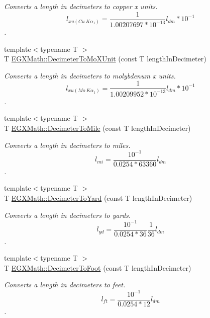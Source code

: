 \begin{DoxyCompactItemize}
\begin{DoxyCompactList}\small\item\em Converts a length in decimeters to copper x units. \[ l_{xu(Cu\ K\alpha_1)}= \frac{1}{1.00207697*10^{-13}} l_{dm} * 10^{-1}\]. \end{DoxyCompactList}\item 
{\footnotesize template$<$typename T $>$ }\\T \mbox{\hyperlink{group___e_g_x_math-_conversions-_length_conversions-_s_i-_decimeter-_non-_s_i_ga609f53e09c9a767639da3ad72905bb71}{E\+G\+X\+Math\+::\+Decimeter\+To\+Mo\+X\+Unit}} (const T length\+In\+Decimeter)
\begin{DoxyCompactList}\small\item\em Converts a length in decimeters to molybdenum x units. \[ l_{xu(Mo\ K\alpha_1)}=\frac{1}{1.00209952*10^{-13}} l_{dm} * 10^{-1}\]. \end{DoxyCompactList}\item 
{\footnotesize template$<$typename T $>$ }\\T \mbox{\hyperlink{group___e_g_x_math-_conversions-_length_conversions-_s_i-_decimeter-_imperial_gab7d9d207fb6aa53999300baf5d9cea16}{E\+G\+X\+Math\+::\+Decimeter\+To\+Mile}} (const T length\+In\+Decimeter)
\begin{DoxyCompactList}\small\item\em Converts a length in decimeters to miles. \[ l_{mi}=\frac{10^{-1}}{0.0254 * 63360} l_{dm} \]. \end{DoxyCompactList}\item 
{\footnotesize template$<$typename T $>$ }\\T \mbox{\hyperlink{group___e_g_x_math-_conversions-_length_conversions-_s_i-_decimeter-_imperial_ga2ffbd73da0cc3cbb36822127433e3267}{E\+G\+X\+Math\+::\+Decimeter\+To\+Yard}} (const T length\+In\+Decimeter)
\begin{DoxyCompactList}\small\item\em Converts a length in decimeters to yards. \[ l_{yd}= \frac{10^{-1}}{0.0254 * 36} \frac{1}{36} l_{dm} \]. \end{DoxyCompactList}\item 
{\footnotesize template$<$typename T $>$ }\\T \mbox{\hyperlink{group___e_g_x_math-_conversions-_length_conversions-_s_i-_decimeter-_imperial_gaf86c80f8ce1e5ab6113a2a912c1f446e}{E\+G\+X\+Math\+::\+Decimeter\+To\+Foot}} (const T length\+In\+Decimeter)
\begin{DoxyCompactList}\small\item\em Converts a length in decimeters to feet. \[ l_{ft}= \frac{10^{-1}}{0.0254 * 12} l_{dm} \]. \end{DoxyCompactList}\item 

\end{DoxyCompactItemize}
